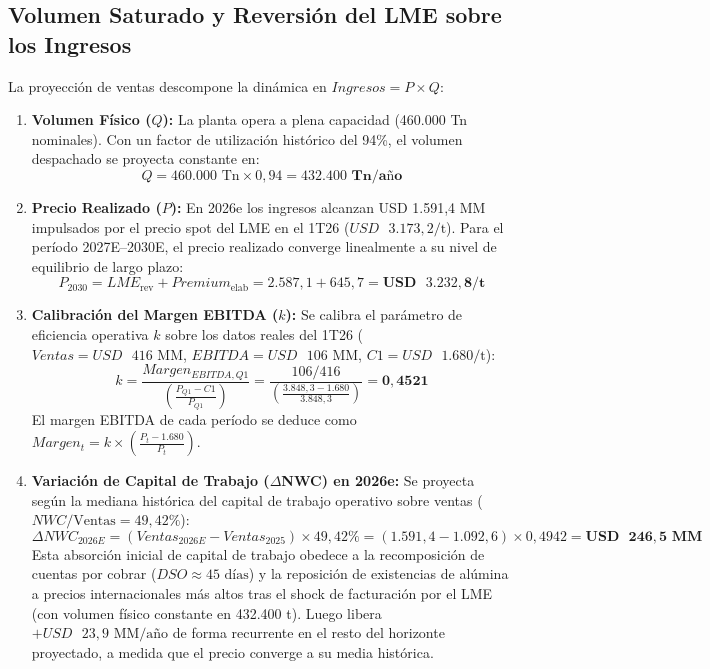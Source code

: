 \documentclass[11pt,a4paper]{article}
\begin{document}
\subsection{Volumen Saturado y Reversión del LME sobre los Ingresos}
La proyección de ventas descompone la dinámica en $Ingresos = P \times Q$:
\begin{enumerate}
    \item \textbf{Volumen Físico ($Q$):} La planta opera a plena capacidad (460.000 Tn nominales). Con un factor de utilización histórico del 94\%, el volumen despachado se proyecta constante en:
    \begin{equation}
        Q = 460.000\text{ Tn} \times 0,94 = \mathbf{432.400\text{ Tn/año}}
    \end{equation}
    \item \textbf{Precio Realizado ($P$):} En 2026e los ingresos alcanzan USD 1.591,4 MM impulsados por el precio spot del LME en el 1T26 ($USD\text{ }3.173,2/\text{t}$). Para el período 2027E--2030E, el precio realizado converge linealmente a su nivel de equilibrio de largo plazo:
    \begin{equation}
        P_{2030} = LME_{\text{rev}} + Premium_{\text{elab}} = 2.587,1 + 645,7 = \mathbf{USD\text{ }3.232,8/\text{t}}
    \end{equation}
    \item \textbf{Calibración del Margen EBITDA ($k$):} Se calibra el parámetro de eficiencia operativa $k$ sobre los datos reales del 1T26 ($Ventas = USD\text{ }416\text{ MM}$, $EBITDA = USD\text{ }106\text{ MM}$, $C1 = USD\text{ }1.680/\text{t}$):
    \begin{equation}
        k = \frac{Margen_{EBITDA, Q1}}{\left(\frac{P_{Q1} - C1}{P_{Q1}}\right)} = \frac{106 / 416}{\left(\frac{3.848,3 - 1.680}{3.848,3}\right)} = \mathbf{0,4521}
    \end{equation}
    El margen EBITDA de cada período se deduce como $Margen_t = k \times \left(\frac{P_t - 1.680}{P_t}\right)$.
    \item \textbf{Variación de Capital de Trabajo ($\Delta$NWC) en 2026e:} Se proyecta según la mediana histórica del capital de trabajo operativo sobre ventas ($NWC/\text{Ventas} = 49,42\%$):
    \begin{equation}
        \Delta NWC_{2026E} = (Ventas_{2026E} - Ventas_{2025}) \times 49,42\% = (1.591,4 - 1.092,6) \times 0,4942 = \mathbf{USD\text{ }246,5\text{ MM}}
    \end{equation}
    Esta absorción inicial de capital de trabajo obedece a la recomposición de cuentas por cobrar ($DSO \approx 45\text{ días}$) y la reposición de existencias de alúmina a precios internacionales más altos tras el shock de facturación por el LME (con volumen físico constante en 432.400 t). Luego libera $+USD\text{ }23,9\text{ MM/año}$ de forma recurrente en el resto del horizonte proyectado, a medida que el precio converge a su media histórica.
\end{enumerate}
\end{document}

